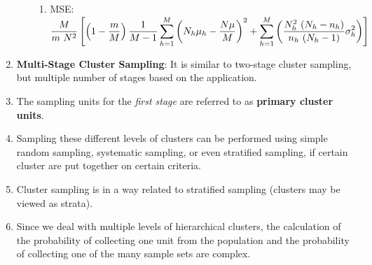 \begin{enumerate}[itemsep=0.2cm]
\begin{enumerate}
\begin{enumerate}[itemsep=0.25cm]
            \item MSE: $
                \dfrac{M}{m\ N^2}
                \left[
                    \left(1 - \dfrac{m}{M}\right)
                    \dfrac{1}{M-1}
                    \displaystyle\sum_{h=1}^{M} \left(N_h\mu_h - \dfrac{N\mu}{M}\right)^2
                    + \displaystyle\sum_{h=1}^{M} \left(
                        \dfrac{N_h^2\ (N_h-n_h)}{n_h\ (N_h-1)}
                    \sigma_h^2
                    \right)
                \right]
            $
            \hfill \cite{statistics/book/Statistics-for-Data-Scientists/Maurits-Kaptein}
        \end{enumerate}
    \end{enumerate}


    \item \textbf{Multi-Stage Cluster Sampling}\label{Sampling Plans/Representative Sampling/Cluster Sampling/Multi-Stage Cluster Sampling}: It is similar to two-stage cluster sampling, but multiple number of stages based on the application.
    \hfill \cite{statistics/book/Statistics-for-Data-Scientists/Maurits-Kaptein}

    \item The sampling units for the \textit{first stage} are referred to as \textbf{primary cluster units}\label{Sampling Plans/Representative Sampling/Cluster Sampling/primary cluster units}.
    \hfill \cite{statistics/book/Statistics-for-Data-Scientists/Maurits-Kaptein}

    \item Sampling these different levels of clusters can be performed using simple random sampling, systematic sampling, or even stratified sampling, if certain cluster are put together on certain criteria.
    \hfill \cite{statistics/book/Statistics-for-Data-Scientists/Maurits-Kaptein}

    \item Cluster sampling is in a way related to stratified sampling (clusters may be viewed as strata).
    \hfill \cite{statistics/book/Statistics-for-Data-Scientists/Maurits-Kaptein}

    \item Since we deal with multiple levels of hierarchical clusters, the calculation of the probability of collecting one unit from the population and the probability of collecting one of the many sample sets are complex.
    \hfill \cite{statistics/book/Statistics-for-Data-Scientists/Maurits-Kaptein}
\end{enumerate}









